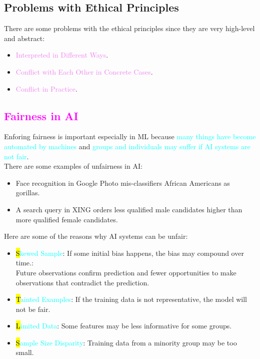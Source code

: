 \documentclass{book}
\begin{document}
\subsection{Problems with Ethical Principles}
There are some problems with the ethical principles since they are very high-level and abstract:
\begin{itemize}
    \item \textcolor{violet}{Interpreted in Different Ways}.
    \item \textcolor{violet}{Conflict with Each Other in Concrete Cases}.
    \item \textcolor{violet}{Conflict in Practice}.
\end{itemize}
\newpage
\textcolor{magenta}{\section{\textbf{Fairness in AI}}}
Enforing fairness is important especially in ML because \textcolor{cyan}{many things have become automated by machines} and \textcolor{cyan}{groups and individuals may suffer if AI systems are not fair}.\\
There are some examples of unfairness in AI:
\begin{itemize}
    \item Face recognition in Google Photo mis-classifiers African Americans as gorillas.
    \item A search query in XING orders less qualified male candidates higher than more qualified female candidates.
\end{itemize}
Here are some of the reasons why AI systems can be unfair:
\begin{itemize}
    \item \textcolor{cyan}{\hl Skewed Sample}: If some initial bias happens, the bias may compound over time.:\\
    Future observations confirm prediction and fewer opportunities to make observations that contradict the prediction.
    \item \textcolor{cyan}{\hl Tainted Examples}: If the training data is not representative, the model will not be fair.
    \item \textcolor{cyan}{\hl Limited Data}: Some features may be less informative for some groups.
    \item \textcolor{cyan}{\hl Sample Size Disparity}: Training data from a minority group may be too small.
\end{itemize}
\end{document}
